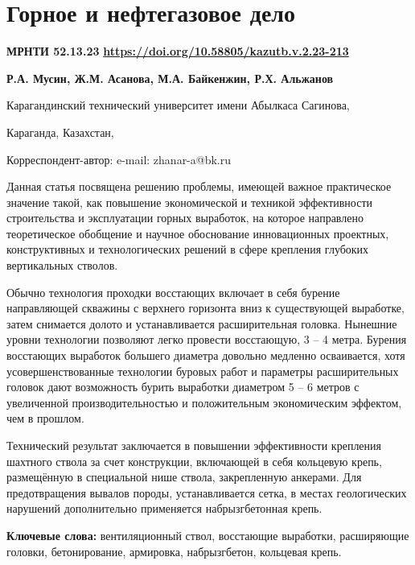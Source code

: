 \let\cleardoublepage\clearpage
\chapter{Горное и нефтегазовое дело}

{\bfseries МРНТИ 52.13.23}
\hfill {\bfseries \href{https://doi.org/10.58805/kazutb.v.2.23-213}{https://doi.org/10.58805/kazutb.v.2.23-213}}


\begin{center}
{\bfseries Р.А. Мусин, Ж.М. Асанова\envelope, М.А. Байкенжин, Р.Х. Альжанов}

Карагандинский технический университет имени Абылкаса Сагинова,

Караганда, Казахстан,

\envelope Корреспондент-автор: e-mail: zhanar-a@bk.ru
\end{center}

Данная статья посвящена решению проблемы, имеющей важное практическое
значение такой, как повышение экономической и техникой эффективности
строительства и эксплуатации горных выработок, на которое направлено
теоретическое обобщение и научное обоснование инновационных проектных,
конструктивных и технологических решений в сфере крепления глубоких
вертикальных стволов.

Обычно технология проходки восстающих включает в себя бурение
направляющей скважины с верхнего горизонта вниз к существующей
выработке, затем снимается долото и устанавливается расширительная
головка. Нынешние уровни технологии позволяют легко провести восстающую,
3 -- 4 метра. Бурения восстающих выработок большего диаметра довольно
медленно осваивается, хотя усовершенствованные технологии буровых работ
и параметры расширительных головок дают возможность бурить выработки
диаметром 5 -- 6 метров с увеличенной производительностью и
положительным экономическим эффектом, чем в прошлом.

Технический результат заключается в повышении эффективности крепления
шахтного ствола за счет конструкции, включающей в себя кольцевую крепь,
размещённую в специальной нише ствола, закрепленную анкерами. Для
предотвращения вывалов породы, устанавливается сетка, в местах
геологических нарушений дополнительно применяется набрызгбетонная крепь.

{\bfseries Ключевые слова:} вентиляционный ствол, восстающие выработки,
расширяющие головки, бетонирование, армировка, набрызгбетон, кольцевая
крепь.

